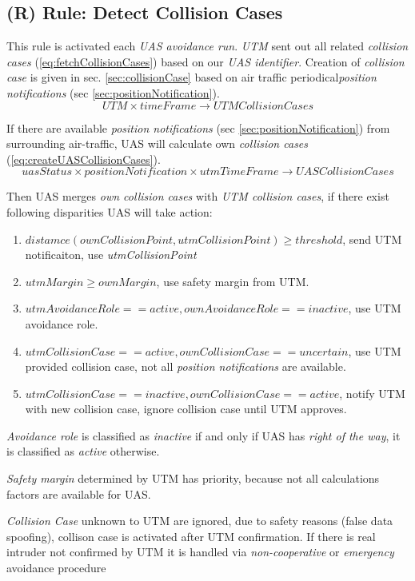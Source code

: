 \subsection{(R) Rule: Detect Collision Cases}\label{sec:detectCollisionCases}
\noindent This rule is activated each \emph{UAS avoidance run}. \emph{UTM} sent out all related \emph{collision cases} (\ref{eq:fetchCollisionCases}) based on our \emph{UAS identifier}. Creation of \emph{collision case} is given in sec. \ref{sec:collisionCase} based on air traffic periodical\emph{position notifications} (sec \ref{sec:positionNotification}).
\begin{equation}\label{eq:fetchCollisionCases}
    UTM\times timeFrame \to UTMCollisionCases
\end{equation}

If there are available \emph{position notifications} (sec \ref{sec:positionNotification}) from surrounding air-traffic, UAS will calculate own \emph{collision cases} (\ref{eq:createUASCollisionCases}).
\begin{equation}\label{eq:createUASCollisionCases}
    uasStatus\times positionNotification\times utmTimeFrame\to UASCollisionCases
\end{equation}

Then UAS merges \emph{own collision cases} with \emph{UTM collision cases}, if there exist following disparities UAS will take action:
\begin{enumerate}
    \item $distamce(ownCollisionPoint,utmCollisionPoint)\ge threshold$, send UTM notificaiton, use \emph{utmCollisionPoint}
    \item $utmMargin \ge ownMargin$, use safety margin from UTM.
    \item $utmAvoidanceRole == active, ownAvoidanceRole == inactive$, use UTM avoidance role.
    \item $utmCollisionCase == active, ownCollisionCase == uncertain$, use UTM provided collision case, not all \emph{position notifications} are available. 
    \item $utmCollisionCase == inactive, ownCollisionCase == active$, notify UTM with new collision case, ignore collision case until UTM approves.
\end{enumerate}
\begin{note}
    \emph{Avoidance role} is classified as \emph{inactive} if and only if UAS has \emph{right of the way}, it is classified as \emph{active} otherwise.
    
    \emph{Safety margin} determined by UTM has priority, because not all calculations factors are available for UAS.
    
    \emph{Collision Case} unknown to UTM are ignored, due to safety reasons (false data spoofing), collison case is activated after UTM confirmation. If there is real intruder not confirmed by UTM it is handled via \emph{non-cooperative} or \emph{emergency} avoidance procedure
\end{note}


